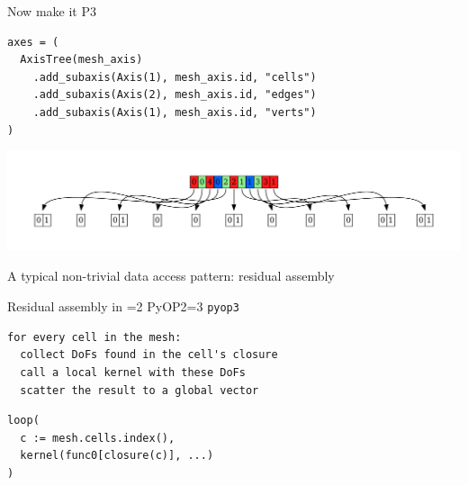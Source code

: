 \documentclass[aspectratio=169]{beamer}
\def\pyop#1{\ifnum#1=2 {PyOP2}\else \ifnum#1=3 {\texttt{pyop3}}\fi \fi}
\begin{document}
\begin{frame}[fragile]{Now make it P3}
  \noindent
  \begin{minipage}{.4\textwidth}
    \begin{tikzpicture}[scale=1.5]
      
    \end{tikzpicture}
  \end{minipage}%
  \begin{minipage}{.55\textwidth}
    \begin{tcolorbox}
      \begin{verbatim}
axes = (
  AxisTree(mesh_axis)
    .add_subaxis(Axis(1), mesh_axis.id, "cells")
    .add_subaxis(Axis(2), mesh_axis.id, "edges")
    .add_subaxis(Axis(1), mesh_axis.id, "verts")
)
      \end{verbatim}
    \end{tcolorbox}
  \end{minipage}

  \pause
  \vspace{-2em}

  \begin{center}
    \includegraphics[width=\textwidth]{scripts/two_cell_P3_layout.gv.pdf}
  \end{center}
\end{frame}

\begin{frame}{A typical non-trivial data access pattern: residual assembly}
  \begin{tikzpicture}
    
  \end{tikzpicture}
\end{frame}

\begin{frame}[fragile]{Residual assembly in \pyop3}
  \begin{tcolorbox}
    \begin{verbatim}
for every cell in the mesh:
  collect DoFs found in the cell's closure
  call a local kernel with these DoFs
  scatter the result to a global vector
    \end{verbatim}
  \end{tcolorbox}

  \pause

  \begin{tcolorbox}
    \begin{verbatim}
loop(
  c := mesh.cells.index(),
  kernel(func0[closure(c)], ...)
)
    \end{verbatim}
  \end{tcolorbox}
\end{frame}
\end{document}
